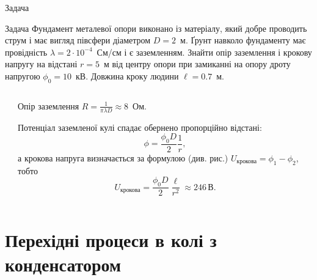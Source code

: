 \documentclass[onlytextwidth]{beamer}
\begin{document}
\begin{frame}{Задача}
	\begin{exampleblock}{Задача}\justifying\scriptsize
		Фундамент металевої опори виконано із матеріалу, який добре проводить струм і має вигляд півсфери діаметром $D = 2$~м. Ґрунт
		навколо фундаменту має провідність $\lambda = 2\cdot 10^{-4}$~См/см і є заземленням. Знайти опір заземлення і крокову напругу на відстані $r = 5$~м
		від центру опори при замиканні на опору дроту напругою $\phi_0 = 10$~кВ. Довжина кроку людини $\ell = 0.7$~м.
	\end{exampleblock}
	\begin{columns}
		\begin{column}{0.6\linewidth}
			\begin{center}
                
			\end{center}
		\end{column}
		\begin{column}{0.4\linewidth}
			\begin{block}{}\justifying\scriptsize
				Опір заземлення $R = \frac{1}{\pi\lambda D} \approx 8$~Ом.

				Потенціал заземленої кулі спадає обернено пропорційно відстані:
				\[
					\phi = \frac{\phi_0 D}{2}\frac{1}{r},
				\]
				а крокова напруга визначається за формулою (див. рис.) $U_\text{крокова} = \phi_1 - \phi_2$, тобто
				\[
					U_\text{крокова} = \frac{\phi_0D}{2}\frac{\ell}{r^2} \approx 246\, \text{В}.
				\]
			\end{block}
		\end{column}
	\end{columns}
\end{frame}


\section{Перехідні процеси в колі з конденсатором}
\end{document}
